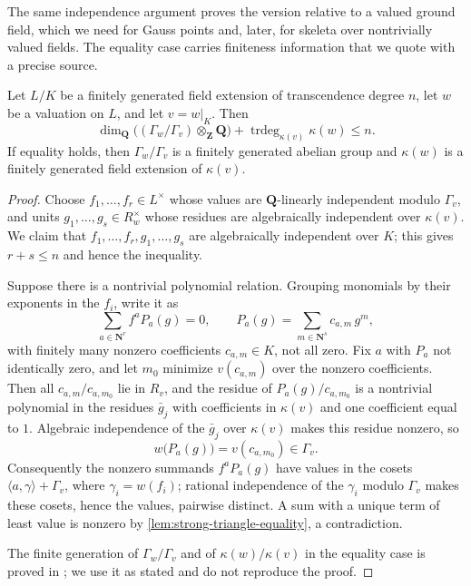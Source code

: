 The same independence argument proves the version relative to a valued
ground field, which we need for Gauss points and, later, for skeleta over
nontrivially valued fields. The equality case carries finiteness
information that we quote with a precise source.

\begin{theorem}
\label{thm:abhyankar-relative}
Let $L/K$ be a finitely generated field extension of transcendence degree
$n$, let $w$ be a valuation on $L$, and let $v=w|_K$. Then
\[
 \dim_{\mathbf Q}\bigl((\Gamma_w/\Gamma_v)\otimes_{\mathbf Z}\mathbf Q\bigr)
 +\operatorname{trdeg}_{\kappa(v)}\kappa(w)\leq n .
\]
If equality holds, then $\Gamma_w/\Gamma_v$ is a finitely generated
abelian group and $\kappa(w)$ is a finitely generated field extension of
$\kappa(v)$.
\end{theorem}
\begin{proof}
Choose $f_1,\ldots,f_r\in L^\times$ whose values are
$\mathbf Q$-linearly independent modulo $\Gamma_v$, and units
$g_1,\ldots,g_s\in R_w^\times$ whose residues are algebraically
independent over $\kappa(v)$. We claim that
$f_1,\ldots,f_r,g_1,\ldots,g_s$ are algebraically independent over $K$;
this gives $r+s\leq n$ and hence the inequality.

Suppose there is a nontrivial polynomial relation. Grouping monomials by
their exponents in the $f_i$, write it as
\[
 \sum_{a\in\mathbf N^r}f^aP_a(g)=0,
 \qquad
 P_a(g)=\sum_{m\in\mathbf N^s}c_{a,m}\,g^m,
\]
with finitely many nonzero coefficients $c_{a,m}\in K$, not all zero.
Fix $a$ with $P_a$ not identically zero, and let $m_0$ minimize
$v(c_{a,m})$ over the nonzero coefficients. Then all
$c_{a,m}/c_{a,m_0}$ lie in $R_v$, and the residue of
$P_a(g)/c_{a,m_0}$ is a nontrivial polynomial in the residues
$\bar g_j$ with coefficients in $\kappa(v)$ and one coefficient equal to
$1$. Algebraic independence of the $\bar g_j$ over $\kappa(v)$ makes this
residue nonzero, so
\[
 w\bigl(P_a(g)\bigr)=v(c_{a,m_0})\in\Gamma_v .
\]
Consequently the nonzero summands $f^aP_a(g)$ have values in the cosets
$\langle a,\gamma\rangle+\Gamma_v$, where $\gamma_i=w(f_i)$; rational
independence of the $\gamma_i$ modulo $\Gamma_v$ makes these cosets, hence
the values, pairwise distinct. A sum with a unique term of least value is
nonzero by \cref{lem:strong-triangle-equality}, a contradiction.

The finite generation of $\Gamma_w/\Gamma_v$ and of
$\kappa(w)/\kappa(v)$ in the equality case is proved in
\cite[Chapter~VI, \S10, no.~3]{AC}; we use it as stated and do not
reproduce the proof.
\end{proof}

